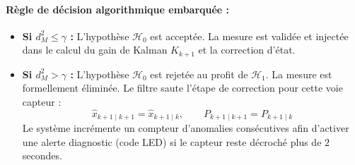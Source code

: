 \documentclass[../Formulations_Kalman.tex]{subfiles}
\begin{document}
\paragraph{Règle de décision algorithmique embarquée :}
\begin{itemize}
    \item \textbf{Si $d_M^2 \le \gamma$ :} L'hypothèse $\mathcal{H}_0$ est acceptée. La mesure est validée et injectée dans le calcul du gain de Kalman $K_{k+1}$ et la correction d'état.
    \item \textbf{Si $d_M^2 > \gamma$ :} L'hypothèse $\mathcal{H}_0$ est rejetée au profit de $\mathcal{H}_1$. La mesure est formellement éliminée. Le filtre saute l'étape de correction pour cette voie capteur :
    \begin{equation}
    \hat{x}_{k+1\mid k+1} = \hat{x}_{k+1\mid k}, \qquad P_{k+1\mid k+1} = P_{k+1\mid k}
    \end{equation}
    Le système incrémente un compteur d'anomalies consécutives afin d'activer une alerte diagnostic (code LED) si le capteur reste décroché plus de $2$ secondes.
\end{itemize}
\end{document}
